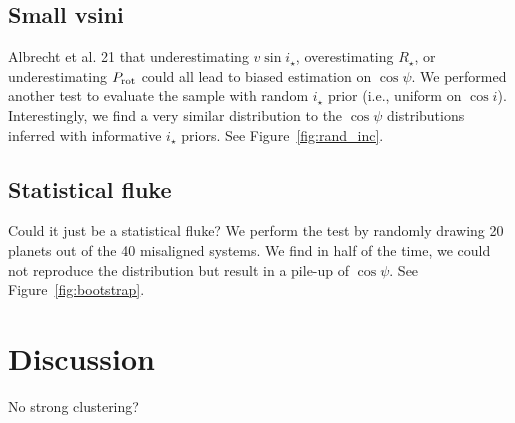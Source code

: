 \documentclass[twocolumn]{aastex631}
\begin{document}
\subsection{Small vsini}
Albrecht et al. 21 that underestimating $v\sin{i_\star}$, overestimating $R_\star$, or underestimating $P_{\rm rot}$ could all lead to biased estimation on $\cos{\psi}$. We performed another test to evaluate the sample with random $i_\star$ prior (i.e., uniform on $\cos{i}$). Interestingly, we find a very similar distribution to the $\cos{\psi}$ distributions inferred with informative $i_\star$ priors. See Figure~\ref{fig:rand_inc}.


\subsection{Statistical fluke}
Could it just be a statistical fluke? We perform the test by randomly drawing 20 planets out of the 40 misaligned systems. We find in half of the time, we could not reproduce the distribution but result in a pile-up of $\cos{\psi}$. See Figure~\ref{fig:bootstrap}.


\section{Discussion}
No strong clustering?


\end{document}
